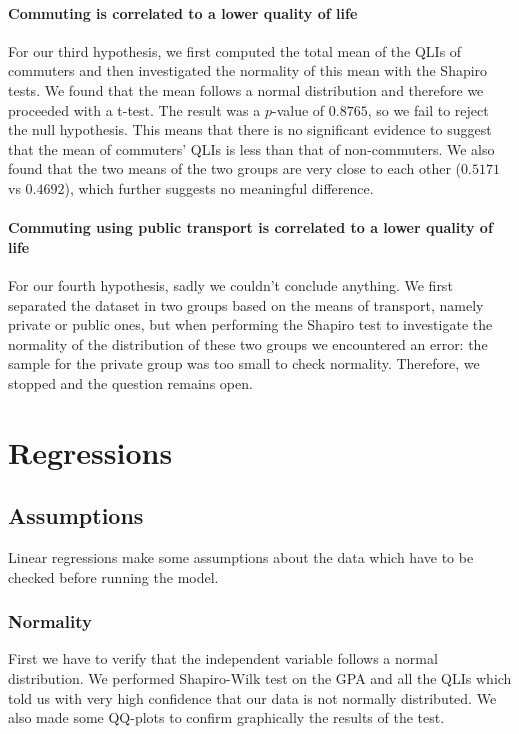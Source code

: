 \documentclass[11pt]{extarticle}
\numberwithin{table}{section}
\numberwithin{figure}{section}
\numberwithin{equation}{section}
\begin{document}
\paragraph{Commuting is correlated to a lower quality of life}
For our third hypothesis, we first computed the total mean of the QLIs of commuters and
then investigated the normality of this mean with the Shapiro tests.
We found that the mean follows a normal distribution and therefore we proceeded with a t-test.
The result was a $p$-value of $0.8765$, so we fail to reject the null hypothesis.
This means that there is no significant evidence to suggest that the mean of commuters' QLIs
is less than that of non-commuters.
We also found that the two means of the two groups are very close to each other
($0.5171$ vs $0.4692$), which further suggests no meaningful difference.

\paragraph{Commuting using public transport is correlated to a lower quality of life}
For our fourth hypothesis, sadly we couldn’t conclude anything.
We first separated the dataset in two groups based on the means of transport,
namely private or public ones, but when performing the Shapiro test to investigate the normality
of the distribution of these two groups we encountered an error:
the sample for the private group was too small to check normality.
Therefore, we stopped and the question remains open.


\section{Regressions}

\subsection{Assumptions}

Linear regressions make some assumptions about the data which have to be checked before
running the model.

\subsubsection{Normality}

First we have to verify that the independent variable follows a normal distribution.
We performed Shapiro-Wilk test on the GPA and all the QLIs which told us
with very high confidence that our data is not normally distributed.
We also made some QQ-plots to confirm graphically the results of the test.
\end{document}
